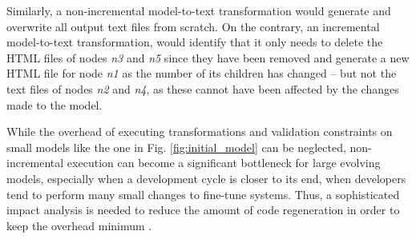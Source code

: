 \documentclass[sigconf]{acmart}
\begin{document}
Similarly, a non-incremental model-to-text transformation would generate and overwrite all output text files from scratch. On the contrary, an incremental model-to-text transformation, would identify that it only needs to delete the HTML files of nodes \emph{n3} and \emph{n5} since they have been removed and generate a new HTML file for node \emph{n1} as the number of its children has changed -- but not the text files of nodes \emph{n2} and \emph{n4}, as these cannot have been affected by the changes made to the model.

While the overhead of executing transformations and validation constraints on small models like the one in Fig. \ref{fig:initial_model} can be neglected, non-incremental execution can become a significant bottleneck for large evolving models, especially when a development cycle is closer to its end, when developers tend to perform many small changes to fine-tune systems. Thus, a sophisticated impact analysis is needed to reduce the amount of code regeneration in order to keep the overhead minimum \cite{selic2003pragmatics}.  
\end{document}
